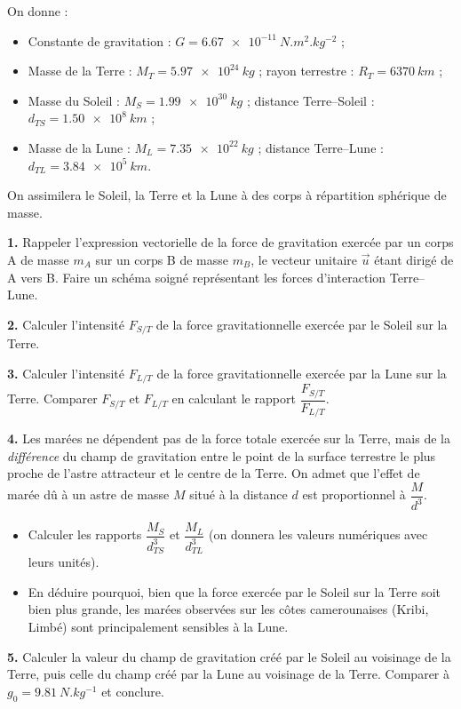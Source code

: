 \documentclass[11pt]{article}
\begin{document}
\begin{exercice}
On donne :
\begin{itemize}
\item Constante de gravitation : $G = \SI{6,67e-11}{N.m^2.kg^{-2}}$ ;
\item Masse de la Terre : $M_T = \SI{5,97e24}{kg}$ ; rayon terrestre : $R_T = \SI{6370}{km}$ ;
\item Masse du Soleil : $M_S = \SI{1,99e30}{kg}$ ; distance Terre--Soleil : $d_{TS} = \SI{1,50e8}{km}$ ;
\item Masse de la Lune : $M_L = \SI{7,35e22}{kg}$ ; distance Terre--Lune : $d_{TL} = \SI{3,84e5}{km}$.
\end{itemize}

On assimilera le Soleil, la Terre et la Lune à des corps à répartition sphérique de masse.

\textbf{1.} Rappeler l'expression vectorielle de la force de gravitation exercée par un corps A de masse $m_A$ sur un corps B de masse $m_B$, le vecteur unitaire $\vec{u}$ étant dirigé de A vers B. Faire un schéma soigné représentant les forces d'interaction Terre--Lune.

\textbf{2.} Calculer l'intensité $F_{S/T}$ de la force gravitationnelle exercée par le Soleil sur la Terre.

\textbf{3.} Calculer l'intensité $F_{L/T}$ de la force gravitationnelle exercée par la Lune sur la Terre. Comparer $F_{S/T}$ et $F_{L/T}$ en calculant le rapport $\dfrac{F_{S/T}}{F_{L/T}}$.

\textbf{4.} Les marées ne dépendent pas de la force totale exercée sur la Terre, mais de la \emph{différence} du champ de gravitation entre le point de la surface terrestre le plus proche de l'astre attracteur et le centre de la Terre. On admet que l'effet de marée dû à un astre de masse $M$ situé à la distance $d$ est proportionnel à $\dfrac{M}{d^3}$.
\begin{itemize}
\item[a)] Calculer les rapports $\dfrac{M_S}{d_{TS}^3}$ et $\dfrac{M_L}{d_{TL}^3}$ (on donnera les valeurs numériques avec leurs unités).
\item[b)] En déduire pourquoi, bien que la force exercée par le Soleil sur la Terre soit bien plus grande, les marées observées sur les côtes camerounaises (Kribi, Limbé) sont principalement sensibles à la Lune.
\end{itemize}

\textbf{5.} Calculer la valeur du champ de gravitation créé par le Soleil au voisinage de la Terre, puis celle du champ créé par la Lune au voisinage de la Terre. Comparer à $g_0 = \SI{9,81}{N.kg^{-1}}$ et conclure.
\end{exercice}
\end{document}
